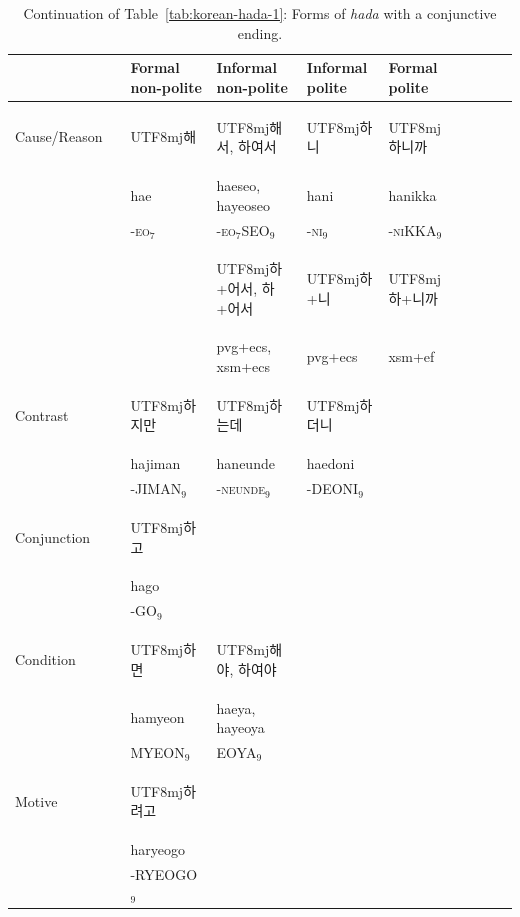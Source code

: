 \documentclass[11pt,letterpaper]{article}
\newcommand{\korean}[1]{\begin{CJK}{UTF8}{mj}#1\end{CJK}}
\begin{document}
\begin{table}
\begin{tabular}{llllllllll}
           &          &Formal non-polite & Informal non-polite & Informal polite & Formal polite \\ \hline \hline
Cause/Reason && \korean{해} & \korean{해서, 하여서} & \korean{하니} & \korean{하니까} \\
&& hae & haeseo, hayeoseo & hani & hanikka \\ 
&& -\textsc{eo}$_7$ & -\textsc{eo}$_7$SEO$_9$ & -\textsc{ni}$_9$ & -\textsc{ni}KKA$_9$ \\
&& &\korean{하+어서, 하+어서} & \korean{하+니} & \korean{하+니까} \\
&& & pvg+ecs, xsm+ecs         & pvg+ecs & xsm+ef \\
\hline
Contrast && \korean{하지만} & \korean{하는데} & \korean{하더니} \\
 && hajiman & haneunde & haedoni & \\ 
 && -JIMAN$_9$ & -\textsc{neunde}$_9$ & -DEONI$_9$ & \\ \hline
Conjunction && \korean{하고} \\
 && hago \\ 
&& -GO$_9$ \\ \hline
Condition && \korean{하면} & \korean{해야, 하여야} \\
&& hamyeon & haeya, hayeoya \\
&& MYEON$_9$ & EOYA$_9$ \\ \hline
Motive && \korean{하려고} \\
 && haryeogo \\
&& -RYEOGO$_9$
\end{tabular}
	\caption{Continuation of Table~\ref{tab:korean-hada-1}: Forms of \textit{hada} with a conjunctive ending.}\label{tab:korean-hada-2}
\end{table}
\end{document}

